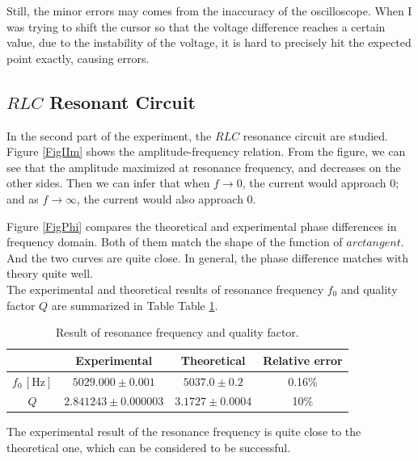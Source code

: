 \documentclass{article}
\begin{document}
Still, the minor errors may comes from the inaccuracy of the oscilloscope. When I was trying to shift the cursor so that the voltage difference reaches a certain value, due to the instability of the voltage, it is hard to precisely hit the expected point exactly, causing errors.

\subsection{$RLC$ Resonant Circuit}

In the second part of the experiment, the $RLC$ resonance circuit are studied. \\

Figure \ref{FigIIm} shows the amplitude-frequency relation. From the figure, we can see that the amplitude maximized at resonance frequency, and decreases on the other sides. Then we can infer that when $f \rightarrow 0$, the current would  approach 0; and as $f\rightarrow \infty$, the current would also approach 0.

Figure \ref{FigPhi} compares the theoretical and experimental phase differences in frequency domain. Both of them match the shape of the function of $arctangent$. And the two curves are quite close. In general, the phase difference matches with theory quite well.\\

The experimental and theoretical results of resonance frequency $f_0$ and quality factor $Q$ are summarized in Table Table \ref{tab:fQ}.

\begin{table}[H] \centering
    \begin{tabular}{cccc}
        \toprule
                           & Experimental           & Theoretical        & Relative error \\
        \midrule
        $f_0\,[\text{Hz}]$ & $5029.000\pm 0.001$    & $5037.0\pm 0.2$    & 0.16\%             \\
        $Q$                & $2.841243\pm 0.000003$ & $3.1727\pm 0.0004$ & 10\%         \\
        \bottomrule
    \end{tabular}
    \caption{Result of resonance frequency and quality factor.}
    \label{tab:fQ}
\end{table}

The experimental result of the resonance frequency is quite close to the theoretical one, which can be considered to be successful.
\end{document}
